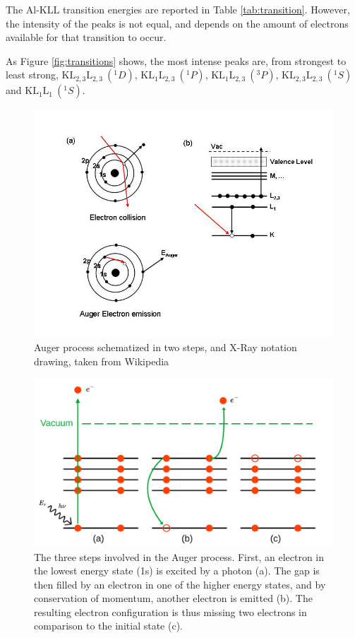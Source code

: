 \documentclass[12pt]{article}
\begin{document}
The Al-KLL transition energies are reported in Table \ref{tab:transition}. However, the intensity of the peaks is not equal, and depends on the amount of electrons available for that transition to occur.

As Figure \ref{fig:transitions} shows, the most intense peaks are, from strongest to least strong, $\text{KL}_{2,3}\text{L}_{2,3}\ ({}^1D)$, $\text{KL}_{1}\text{L}_{2,3}\ ({}^1P)$, $\text{KL}_{1}\text{L}_{2,3}\ ({}^3P)$, $\text{KL}_{2,3}\text{L}_{2,3}\ ({}^1S)$ and $\text{KL}_{1}\text{L}_{1}\ ({}^1S)$.
\begin{figure}[H]
  \includegraphics[width=\linewidth]{Auger_Process.jpg}
  \caption{Auger process schematized in two steps, and X-Ray notation drawing, taken from Wikipedia \cite{wiki:auger}}
  \label{fig:auger}
\end{figure}

\begin{figure}[h!]
  \includegraphics[width=\linewidth]{sabbirdrawing.pdf}
  \caption{The three steps involved in the Auger process. First, an electron in the lowest energy state (1s) is excited by a photon (a). The gap is then filled by an electron in one of the higher energy states, and by conservation of momentum, another electron is emitted (b). The resulting electron configuration is thus missing two electrons in comparison to the initial state (c).}
  \label{sabbirdrawing}
\end{figure}
\end{document}
